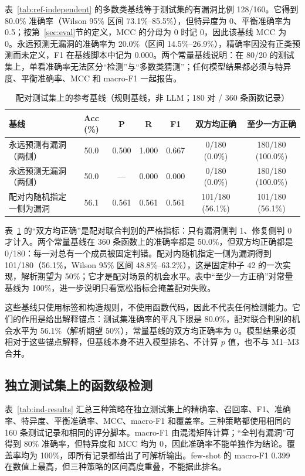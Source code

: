 \documentclass[conference]{IEEEtran}
\begin{document}
表~\ref{tab:ref-independent} 的多数类基线等于测试集的有漏洞比例 128/160。它得到 80.0\% 准确率（Wilson 95\% 区间 73.1\%--85.5\%），但特异度为 0、平衡准确率为 0.5；按第~\ref{sec:eval}节的定义，MCC 的分母为 0 时记 0，因此该基线 MCC 为 0。永远预测无漏洞的准确率为 20.0\%（区间 14.5\%--26.9\%），精确率因没有正类预测而未定义，F1 在基线脚本中记为 0.000。两个常量基线说明：在 80/20 的测试集上，单看准确率无法区分“检测”与“多数类猜测”；任何模型结果都必须与特异度、平衡准确率、MCC 和 macro-F1 一起报告。

\begin{table}[t]
\caption{配对测试集上的参考基线（规则基线，非 LLM；180 对 / 360 条函数记录）}
\label{tab:ref-paired}
\centering
\small
\begin{tabular}{@{}lcccccc@{}}
\toprule
基线 & Acc (\%) & P & R & F1 & 双方均正确 & 至少一方正确\\
\midrule
永远预测有漏洞（两侧） & 50.0 & 0.500 & 1.000 & 0.667 & 0/180 (0.0\%) & 180/180 (100.0\%)\\
永远预测无漏洞（两侧） & 50.0 & --- & 0.000 & 0.000 & 0/180 (0.0\%) & 180/180 (100.0\%)\\
配对内随机指定一侧为漏洞 & 56.1 & 0.561 & 0.561 & 0.561 & 101/180 (56.1\%) & 101/180 (56.1\%)\\
\bottomrule
\end{tabular}
\end{table}

表~\ref{tab:ref-paired} 的“双方均正确”是配对联合判别的严格指标：只有漏洞侧判 1、修复侧判 0 才计入。两个常量基线在 360 条函数上的准确率都是 50.0\%，但双方均正确都是 0/180：每一对总有一个成员被固定判错。配对内随机指定一侧为漏洞得到 101/180（56.1\%，Wilson 95\% 区间 48.8\%--63.2\%），这是固定种子 42 的一次实现，解析期望为 50\%；它才是配对场景的机会水平。表中“至少一方正确”对常量基线为 100\%，进一步说明只看宽松指标会掩盖配对失败。

这些基线只使用标签和构造规则，不使用函数代码，因此不代表任何检测能力。它们的作用是给出解释锚点：测试集准确率的平凡下限是 80.0\%，配对联合判别的机会水平为 56.1\%（解析期望 50\%），常量基线的双方均正确率为 0。模型结果必须相对于这些锚点解释，但基线本身不进入模型排名、不计算 $p$ 值，也不与 M1--M3 合并。

\subsection{独立测试集上的函数级检测}
表~\ref{tab:ind-results} 汇总三种策略在独立测试集上的精确率、召回率、F1、准确率、特异度、平衡准确率、MCC、macro-F1 和覆盖率。三种策略都使用相同的 160 条测试记录和相同的评分脚本。macro-F1 由混淆矩阵计算；“全判有漏洞”可得到 80\% 准确率，但特异度和 MCC 均为 0，因此准确率不能单独作为结论。覆盖率均为 100\%，即所有记录都给出了可解析输出。few-shot 的 macro-F1 0.399 在数值上最高，但三种策略的区间高度重叠，不能据此排名。
\end{document}
